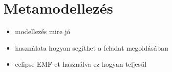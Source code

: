 \section{Metamodellezés}
\begin{itemize}
  \item modellezés mire jó
  \item	használata hogyan segíthet a feladat megoldásában
  \item eclipse EMF-et használva ez hogyan teljesül
\end{itemize}